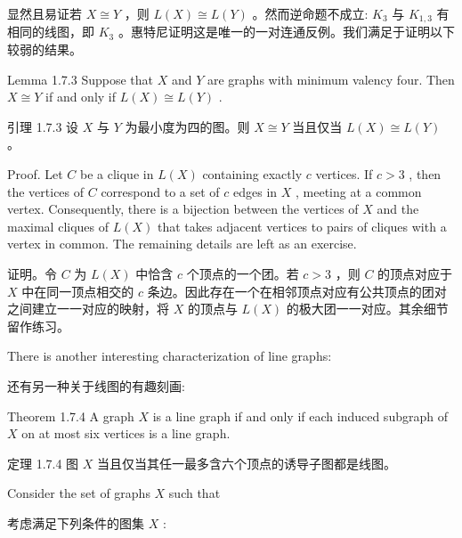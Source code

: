 \documentclass[10pt]{article}
\begin{document}
\begin{tcolorbox}\relax
显然且易证若 \(X \cong  Y\) ，则 \(L\left( X\right)  \cong  L\left( Y\right)\) 。然而逆命题不成立: \({K}_{3}\) 与 \({K}_{1,3}\) 有相同的线图，即 \({K}_{3}\) 。惠特尼证明这是唯一的一对连通反例。我们满足于证明以下较弱的结果。
\end{tcolorbox}

Lemma 1.7.3 Suppose that \(X\) and \(Y\) are graphs with minimum valency four. Then \(X \cong  Y\) if and only if \(L\left( X\right)  \cong  L\left( Y\right)\) .

\begin{tcolorbox}\relax
引理 1.7.3 设 \(X\) 与 \(Y\) 为最小度为四的图。则 \(X \cong  Y\) 当且仅当 \(L\left( X\right)  \cong  L\left( Y\right)\) 。
\end{tcolorbox}

Proof. Let \(C\) be a clique in \(L\left( X\right)\) containing exactly \(c\) vertices. If \(c > 3\) , then the vertices of \(C\) correspond to a set of \(c\) edges in \(X\) , meeting at a common vertex. Consequently, there is a bijection between the vertices of \(X\) and the maximal cliques of \(L\left( X\right)\) that takes adjacent vertices to pairs of cliques with a vertex in common. The remaining details are left as an exercise.

\begin{tcolorbox}\relax
证明。令 \(C\) 为 \(L\left( X\right)\) 中恰含 \(c\) 个顶点的一个团。若 \(c > 3\) ，则 \(C\) 的顶点对应于 \(X\) 中在同一顶点相交的 \(c\) 条边。因此存在一个在相邻顶点对应有公共顶点的团对之间建立一一对应的映射，将 \(X\) 的顶点与 \(L\left( X\right)\) 的极大团一一对应。其余细节留作练习。
\end{tcolorbox}

There is another interesting characterization of line graphs:

\begin{tcolorbox}\relax
还有另一种关于线图的有趣刻画:
\end{tcolorbox}

Theorem 1.7.4 A graph \(X\) is a line graph if and only if each induced subgraph of \(X\) on at most six vertices is a line graph.

\begin{tcolorbox}\relax
定理 1.7.4 图 \(X\) 当且仅当其任一最多含六个顶点的诱导子图都是线图。
\end{tcolorbox}

Consider the set of graphs \(X\) such that

\begin{tcolorbox}\relax
考虑满足下列条件的图集 \(X\) :
\end{tcolorbox}
\end{document}

